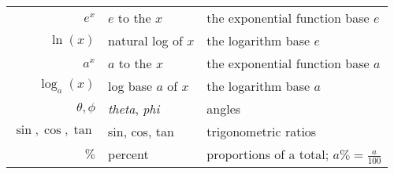 {\begin{tabularx}{\textwidth}{@{}rlp{5.9cm}@{}}
$e^x$ 
	& $e$ to the $x$ 
	& the exponential function base $e$ \\
$\ln(x)$ 
	& natural log of $x$ 
	& the logarithm base $e$ 				\\
$a^x$ 
	& $a$ to the $x$ 
	& the exponential function base $a$ \\
$\log_a(x)$ 
	& log base $a$ of $x$ 
	& the logarithm base $a$ 				\\[2mm]
$\theta,\phi$
	& \emph{theta}, \emph{phi}
	& angles 					\\
$\sin,\cos,\tan$
	& sin, cos, tan 
	& trigonometric ratios 			\\
$\%$
	& percent
	& proportions of a total; $a\%=\frac{a}{100}$ 		\\
\bottomrule
\end{tabularx}
}%
